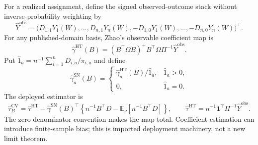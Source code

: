 For a realized assignment, define the signed observed-outcome stack without inverse-probability weighting by
\[
 \widehat Y^{\mathrm{obs}}
 =\bigl(D_{1,1}Y_1(W),\ldots,D_{n,1}Y_n(W),
 -D_{1,0}Y_1(W),\ldots,-D_{n,0}Y_n(W)\bigr)^{\top}.
\]
For any published-domain basis, Zhao's observable coefficient map is
\[
 \widehat\gamma^{\mathrm{HT}}(B)
 =(B^{\top}\Omega B)^+B^{\top}\Omega\Pi^{-1}\widehat Y^{\mathrm{obs}}.
\]
Put \(\widehat 1_a=n^{-1}\sum_{i=1}^nD_{i,a}/\pi_{i,a}\) and define
\[
 \widehat\gamma^{\mathrm{SN}}_a(B)=
 \begin{cases}
 \widehat\gamma^{\mathrm{HT}}_a(B)/\widehat 1_a,&\widehat 1_a>0,\\
 0,&\widehat 1_a=0.
 \end{cases}
\]
The deployed estimator is
\[
 \widehat\tau_B^{\mathrm{CV}}
 =\widehat\tau^{\mathrm{HT}}
 -\widehat\gamma^{\mathrm{SN}}(B)^{\top}
 \left\{n^{-1}B^{\top}D-\mathbb E_\nu[n^{-1}B^{\top}D]\right\},
 \qquad
 \widehat\tau^{\mathrm{HT}}=n^{-1}\mathbf1^{\top}\Pi^{-1}\widehat Y^{\mathrm{obs}}.
\]
The zero-denominator convention makes the map total.  Coefficient estimation can introduce finite-sample bias; this is imported deployment machinery, not a new limit theorem.